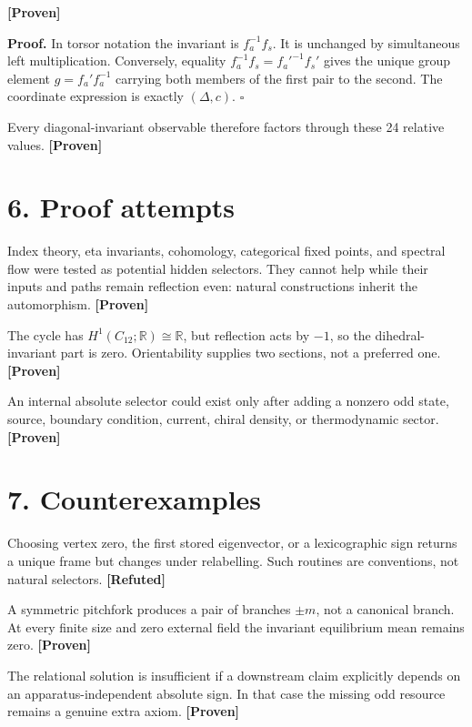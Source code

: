 \documentclass[11pt,a4paper,openany]{report}
\newcommand{\statusProven}{\textcolor{fingreen}{[Proven]}}
\newcommand{\statusRefuted}{\textcolor{finred}{[Refuted]}}
\begin{document}
\textbf{\statusProven{}}

\textbf{Proof.} In torsor notation the invariant is \(f_a^{-1}f_s\). It is unchanged by simultaneous left multiplication. Conversely, equality \(f_a^{-1}f_s=f_a'^{-1}f_s'\) gives the unique group element \(g=f_a'f_a^{-1}\) carrying both members of the first pair to the second. The coordinate expression is exactly \((\Delta,c)\). \(\square\)

Every diagonal-invariant observable therefore factors through these 24 relative values. \textbf{\statusProven{}}

\section{6. Proof attempts}

Index theory, eta invariants, cohomology, categorical fixed points, and spectral flow were tested as potential hidden selectors. They cannot help while their inputs and paths remain reflection even: natural constructions inherit the automorphism. \textbf{\statusProven{}}

The cycle has \(H^1(C_{12};\mathbb R)\cong\mathbb R\), but reflection acts by \(-1\), so the dihedral-invariant part is zero. Orientability supplies two sections, not a preferred one. \textbf{\statusProven{}}

An internal absolute selector could exist only after adding a nonzero odd state, source, boundary condition, current, chiral density, or thermodynamic sector. \textbf{\statusProven{}}

\section{7. Counterexamples}

Choosing vertex zero, the first stored eigenvector, or a lexicographic sign returns a unique frame but changes under relabelling. Such routines are conventions, not natural selectors. \textbf{\statusRefuted{}}

A symmetric pitchfork produces a pair of branches \(\pm m\), not a canonical branch. At every finite size and zero external field the invariant equilibrium mean remains zero. \textbf{\statusProven{}}

The relational solution is insufficient if a downstream claim explicitly depends on an apparatus-independent absolute sign. In that case the missing odd resource remains a genuine extra axiom. \textbf{\statusProven{}}
\end{document}
